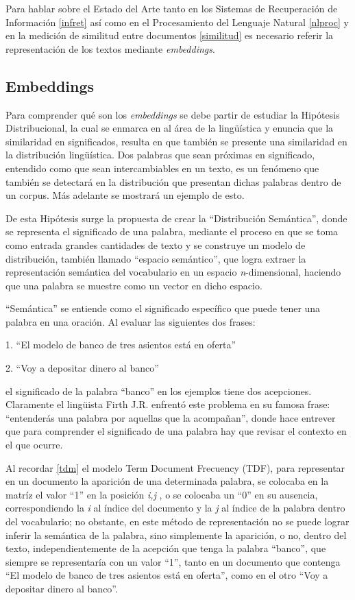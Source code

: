 \documentclass[
  12pt,
  openany]{book}
\begin{document}
Para hablar sobre el Estado del Arte tanto en los Sistemas de Recuperación de Información \ref{infret} así como en el Procesamiento del Lenguaje Natural \ref{nlproc} y en la medición de similitud entre documentos \ref{similitud} es necesario referir la representación de los textos mediante \emph{embeddings}.

\hypertarget{embed}{%
\subsection{Embeddings}\label{embed}}

Para comprender qué son los \emph{embeddings} se debe partir de estudiar la Hipótesis~ Distribucional, la cual se enmarca en al área de la lingüística y enuncia que la similaridad en significados, resulta en que también se presente una similaridad en la distribución lingüística. Dos palabras que sean próximas en significado, entendido como que sean intercambiables en un texto, es un fenómeno que también se detectará en la distribución que presentan dichas palabras dentro de un corpus. Más adelante se mostrará un ejemplo de esto.

De esta Hipótesis surge la propuesta de crear la ``Distribución Semántica'', donde se representa el significado de una palabra, mediante el proceso en que se toma como entrada grandes cantidades de texto y se construye un modelo de distribución, también llamado ``espacio semántico'', que logra extraer la representación semántica del vocabulario en un espacio \emph{n}-dimensional, haciendo que una palabra se muestre como un vector en dicho espacio.

``Semántica'' se entiende como el significado específico que puede tener una palabra en una oración. Al evaluar las siguientes dos frases:

1. ``El modelo de banco de tres asientos está en oferta''

2. ``Voy a depositar dinero al banco''

el significado de la palabra ``banco'' en los ejemplos tiene dos acepciones. Claramente el lingüista Firth J.R. enfrentó este problema en su famosa frase: ``entenderás una palabra por aquellas que la acompañan'', donde hace entrever que para comprender el significado de una palabra hay que revisar el contexto en el que ocurre.

Al recordar \ref{tdm} el modelo Term Document Frecuency (TDF), para representar en un documento la aparición de una determinada palabra, se colocaba en la matríz el valor ``1'' en la posición \emph{i,j} , o se colocaba un ``0'' en su ausencia, correspondiendo la \emph{i} al índice del documento y la \emph{j} al índice de la palabra dentro del vocabulario; no obstante, en este método de representación no se puede lograr inferir la semántica de la palabra, sino simplemente la aparición, o no, dentro del texto, independientemente de la acepción que tenga la palabra ``banco'', que siempre se representaría con un valor ``1'', tanto en un documento que contenga ``El modelo de banco de tres asientos está en oferta'', como en el otro ``Voy a depositar dinero al banco''.
\end{document}
